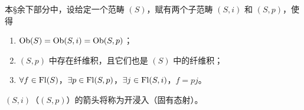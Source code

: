 \setcounter{subsubsection}{3}
\subsubsection{}
本\S 余下部分中，设给定一个范畴 $(S)$，赋有两个子范畴 $(S,i)$ 和 $(S,p)$，使得
\begin{enumerate}
\renewcommand{\theenumi}{\roman{enumi}}
\renewcommand{\labelenumi}{(\theenumi)}
\item $\operatorname{Ob}(S)=\operatorname{Ob}(S,i)=\operatorname{Ob}(S,p)$；

\item $(S,p)$ 中存在纤维积，且它们也是 $(S)$ 中的纤维积；

\item $\forall f\in \operatorname{Fl}(S)$，$\exists p\in \operatorname{Fl}(S,p)$，$\exists
j\in \operatorname{Fl}(S,i)$，$f=pj$。
\end{enumerate}

$(S,i)$（\resp $(S,p)$）的箭头将称为开浸入（\resp 固有态射）。

